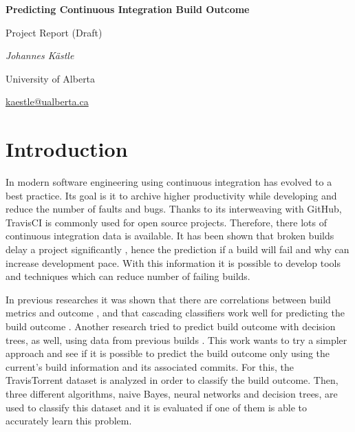 \documentclass[a4paper,11pt]{article}
\begin{document}
	
	\begin{center}
	{\huge\bfseries Predicting Continuous Integration Build Outcome \par}
	{\Large Project Report (Draft)\par}
	
	\vspace{1cm}
	{\Large\itshape Johannes Kästle\par}
	{ University of Alberta \par}
	\href{mailto:kaestle@ualberta.ca}{kaestle@ualberta.ca}
	\end{center}


\setlength{\parindent}{0pt}
\setlength{\parskip}{1.5ex plus0.5ex minus0.5ex}

\begin{abstract}
	In order to improve developers productivity and increase pace, it is tried to predict the outcome of continuous integration builds. For that, $2,500,756$ builds with $37$ features were analyzed, using three different machine learning algorithms with over $700$ configurations. Generally, all classifiers struggled with predicting failures, but had high sensitivity. In the end, the decision tree classifier could predict the outcome with an accuracy of $76\%$ and performed significantly better than its competitors. 
\end{abstract}

\section{Introduction}

In modern software engineering using continuous integration has evolved to a best practice. Its goal is it to archive higher productivity while developing and reduce the number of faults and bugs. Thanks to its interweaving with GitHub, TravisCI is commonly used for open source projects. Therefore, there lots of continuous integration data is available. It has been shown that broken builds delay a project significantly \cite{CIDelay}, hence the prediction if a build will fail and why can increase development pace. With this information it is possible to develop tools and techniques which can reduce number of failing builds. 

In previous researches it was shown that there are correlations between build metrics and outcome \cite{correlation}, and that cascading classifiers work well for predicting the build outcome \cite{cascade}. Another research tried to predict build outcome with decision trees, as well, using data from previous builds \cite{treeTimes}. This work wants to try a simpler approach and see if it is possible to predict the build outcome only using the current's build information and its associated commits. For this, the TravisTorrent \cite{msr17challenge} dataset is analyzed in order to classify the build outcome. Then, three different algorithms, naive Bayes, neural networks and decision trees, are used to classify this dataset and it is evaluated if one of them is able to accurately learn this problem. 
\end{document}
